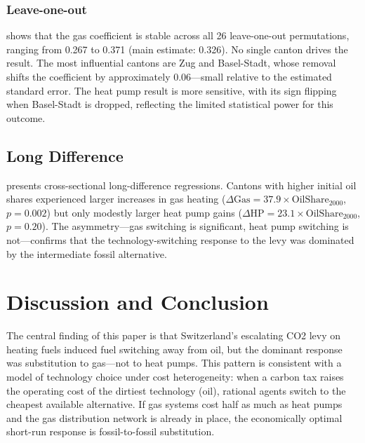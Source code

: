 \documentclass[12pt]{article}
\begin{document}


\subsubsection*{Leave-one-out}  shows that the gas coefficient is stable across all 26 leave-one-out permutations, ranging from 0.267 to 0.371 (main estimate: 0.326). No single canton drives the result. The most influential cantons are Zug and Basel-Stadt, whose removal shifts the coefficient by approximately 0.06---small relative to the estimated standard error. The heat pump result is more sensitive, with its sign flipping when Basel-Stadt is dropped, reflecting the limited statistical power for this outcome.



\subsection{Long Difference}

 presents cross-sectional long-difference regressions. Cantons with higher initial oil shares experienced larger increases in gas heating ($\Delta\text{Gas} = 37.9 \times \text{OilShare}_{2000}$, $p = 0.002$) but only modestly larger heat pump gains ($\Delta\text{HP} = 23.1 \times \text{OilShare}_{2000}$, $p = 0.20$). The asymmetry---gas switching is significant, heat pump switching is not---confirms that the technology-switching response to the levy was dominated by the intermediate fossil alternative.




\section{Discussion and Conclusion}
\label{sec:discussion}

The central finding of this paper is that Switzerland's escalating CO2 levy on heating fuels induced fuel switching away from oil, but the dominant response was substitution to gas---not to heat pumps. This pattern is consistent with a model of technology choice under cost heterogeneity: when a carbon tax raises the operating cost of the dirtiest technology (oil), rational agents switch to the cheapest available alternative. If gas systems cost half as much as heat pumps and the gas distribution network is already in place, the economically optimal short-run response is fossil-to-fossil substitution.
\end{document}
